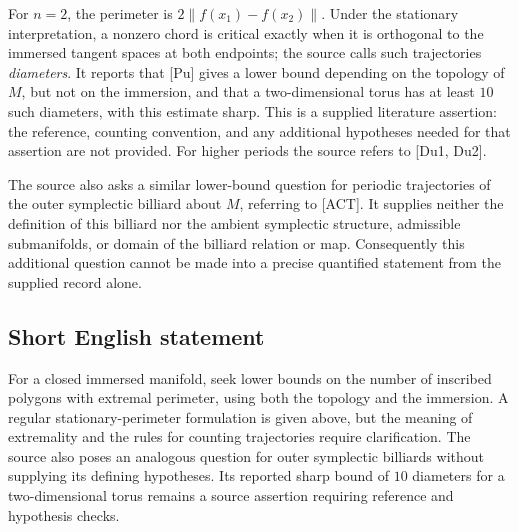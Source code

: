 \documentclass[11pt]{article}
\begin{document}
For \(n=2\), the perimeter is \(2\|f(x_1)-f(x_2)\|\). Under the stationary interpretation, a nonzero chord is critical exactly when it is orthogonal to the immersed tangent spaces at both endpoints; the source calls such trajectories \emph{diameters}. It reports that [Pu] gives a lower bound depending on the topology of \(M\), but not on the immersion, and that a two-dimensional torus has at least \(10\) such diameters, with this estimate sharp. This is a supplied literature assertion: the reference, counting convention, and any additional hypotheses needed for that assertion are not provided. For higher periods the source refers to [Du1, Du2].

The source also asks a similar lower-bound question for periodic trajectories of the outer symplectic billiard about \(M\), referring to [ACT]. It supplies neither the definition of this billiard nor the ambient symplectic structure, admissible submanifolds, or domain of the billiard relation or map. Consequently this additional question cannot be made into a precise quantified statement from the supplied record alone.
\subsection{Short English statement}
For a closed immersed manifold, seek lower bounds on the number of inscribed polygons with extremal perimeter, using both the topology and the immersion. A regular stationary-perimeter formulation is given above, but the meaning of extremality and the rules for counting trajectories require clarification. The source also poses an analogous question for outer symplectic billiards without supplying its defining hypotheses. Its reported sharp bound of \(10\) diameters for a two-dimensional torus remains a source assertion requiring reference and hypothesis checks.
\end{document}
